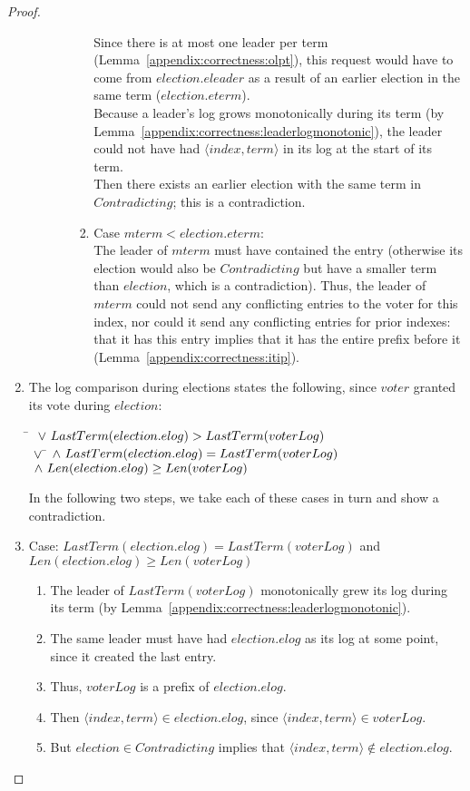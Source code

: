 \begin{proof}
\begin{enumerate}
\begin{enumerate}
\begin{enumerate}
\begin{enumerate}
Since there is at most one leader per term
(Lemma~\ref{appendix:correctness:olpt}), this request would have to come
from $election.eleader$ as a result of an earlier election in the same
term ($election.eterm$).
\\
Because a leader's log grows monotonically during its term (by
Lemma~\ref{appendix:correctness:leaderlogmonotonic}),
the leader could not have had $\langle index, term \rangle$ in
its log at the start of its term.
\\
Then there exists an earlier election with the same term in $Contradicting$;
this is a contradiction.
\item Case $mterm < election.eterm$:\\
The leader of $mterm$ must have contained the entry (otherwise its
election would also be $Contradicting$ but have a smaller term than
$election$, which is a contradiction).
Thus, the leader of $mterm$ could not send any conflicting entries to
the voter for this index,
nor could it send
any conflicting entries for prior indexes: that it has this entry
implies that it has the entire prefix before it
(Lemma~\ref{appendix:correctness:itip}).
\end{enumerate}
\end{enumerate}
\end{enumerate}

\item The log comparison during elections states the following,
since $voter$ granted its vote during $election$:
\begin{tabbing}
\tab\=\+
$\ \lor\  LastTerm(election.elog) > LastTerm(voterLog)$ \\
$\ \lor\ $\=\+$\ \land\  LastTerm(election.elog) = LastTerm(voterLog)$ \\
            $\ \land\  Len(election.elog) \geq Len(voterLog)$
\end{tabbing}

In the following two steps, we take each of these cases in turn and show a
contradiction.

\item Case: $LastTerm(election.elog) = LastTerm(voterLog)$ and \\
            $Len(election.elog) \geq Len(voterLog)$
\begin{enumerate}
\item The leader of $LastTerm(voterLog)$ monotonically grew its log
during its term (by
Lemma~\ref{appendix:correctness:leaderlogmonotonic}).
\item The same leader must have had $election.elog$ as its log at some
point, since it created the last entry.
\item Thus, $voterLog$ is a prefix of $election.elog$.
\item Then $\langle index, term \rangle \in election.elog$,
since $\langle index, term \rangle \in voterLog$.
\item But $election \in Contradicting$ implies that
$\langle index, term \rangle \notin election.elog$.
\end{enumerate}


\end{enumerate}
\end{proof}
